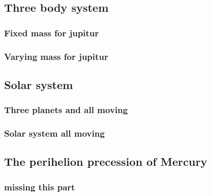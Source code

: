 






\subsection{Three body system}

\subsubsection{Fixed mass for jupitur}


\subsubsection{Varying mass for jupitur}




\subsection{Solar system}


\subsubsection{Three planets and all moving}


\subsubsection{Solar system all moving}





\subsection{The perihelion precession of Mercury}

\subsubsection{missing this part}